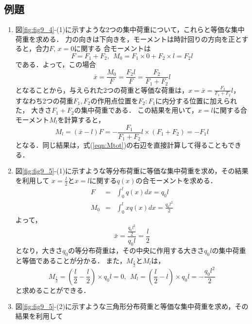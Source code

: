 \documentclass[10pt,a4j]{jbook}
\begin{document}
\subsection{例題}
\begin{enumerate}
\item
図\ref{fig:fig9_4}-(1)に示すような2つの集中荷重について，これらと等価な集中荷重を求める．
力の向きは下向きを，モーメントは時計回りの方向を正とすると，合力$F$, $x=0$に関する
合モーメントは
\begin{equation}
	F=F_1+F_2, \ \ M_0=F_1\times 0 + F_2 \times l =F_2l
	\label{eqn:ans1_1}
\end{equation}
である．よって，この場合
\begin{equation}
	\bar x = \frac{M_0}{F}=\frac{F_2l}{F}= \frac{F_2}{F_1+F_2}l
	\label{eqn:xbar1_1}
\end{equation}
となることから，与えられた2つの荷重と等価な荷重は，$x=\bar x = \frac{F_2}{F_1+F_2}l$，
すなわち2つの荷重$F_1,F_2$の作用点位置を$F_2:F_1$に内分する位置に加えられた，
大きさ$F_1+F_2$の集中荷重である．
この結果を用いて，$x=l$に関する合モーメント$M_l$を計算すると，
\begin{equation}
	M_l=(\bar x- l ) F = -\frac{F_1}{F_1+F_2}l \times (F_1+F_2)= -F_1l
	\label{eqn:Ml1_1}
\end{equation}
となる．同じ結果は，式(\ref{eqn:Mtot})の右辺を直接計算して得ることもできる．
\item
図\ref{fig:fig9_5}-(1)に示すような等分布荷重に等価な集中荷重を求め，その結果を利用して
$x=\frac{l}{2}$と$x=l$に関する$q(x)$の合モーメントを求める．
\begin{eqnarray}
	F & =& \int _0^l q(x)dx= q_0l
	\label{eqn:}
	\\
	M_0 & =& \int _0^l xq(x)dx= \frac{q_0l^2}{2}
\end{eqnarray}
よって，
\begin{equation}
	\bar x= \frac{\frac{q_0l^2}{2}}{q_0l}=\frac{l}{2}
	\label{eqn:xbar_rec}
\end{equation}
となり，大きさ$q_0$の等分布荷重は，その中央に作用する大きさ$q_0l$の集中荷重と等価であることが分かる．
また，$M_{\frac{l}{2}}$と$M_{l}$は，
\begin{equation}
	M_{\frac{l}{2}}=\left(\frac{l}{2}-\frac{l}{2}\right)\times q_0l = 0 ,\ \ 
	M_{l}=\left(\frac{l}{2}-l\right)\times q_0l = -\frac{q_0l^2}{2}
	\label{eqn:}
\end{equation}
と求めることができる．
\item
図\ref{fig:fig9_5}-(2)に示すような三角形分布荷重と等価な集中荷重を求め，その結果を利用して

\end{enumerate}
\end{document}
